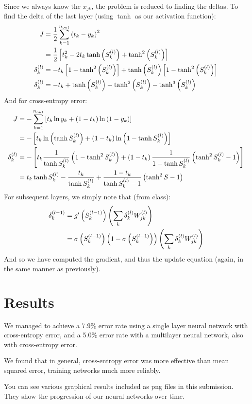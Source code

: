 \documentclass[11pt]{article}
\begin{document}
Since we always know the $x_{jk}$, the problem is reduced to finding the deltas. To find the delta of the last layer (using $\tanh$ as our activation function):
\begin{align}
	J &= \frac{1}{2}\sum_{k=1}^{n_{out}}\left( t_k - y_k \right) ^2 \\
	&= \frac{1}{2}\left[ t_k^2 - 2t_k \tanh \left( S_k^{(l)} \right) + \tanh ^2 \left( S_k^{(l)} \right) \right] \\
	\delta_k^{(l)} &=  - t_k \left[ 1 - \tanh ^2 \left( S_k^{(l)} \right) \right] + \tanh \left( S_k^{(l)} \right) \left[ 1 - \tanh ^2 \left( S_k^{(l)} \right) \right] \\
	\delta_k^{(l)} &= -t_k + \tanh \left( S_k^{(l)} \right) + \tanh ^2 \left( S_k^{(l)} \right) - \tanh ^3 \left( S_k^{(l)} \right) 
\end{align}
And for cross-entropy error:
\begin{align}
	J &= - \sum_{k=1}^{n_{out}}\left[t_k \ln y_k + \left(1- t_k \right)\ln \left( 1- y_k \right) \right] \\
	&= - \left[ t_k \ln \left( \tanh S_k^{(l)} \right) + \left( 1 - t_k \right) \ln \left( 1 - \tanh S_k^{(l)} \right) \right] \\
	\delta_k^{(l)} &= - \left[ t_k \frac{1}{\tanh S_k^{(l)}} \left( 1 - \tanh ^2 S_k^{(l)} \right) + \left( 1 - t_k \right) \frac{1}{1 - \tanh S_k^{(l)}} \left( \tanh ^2 S_k^{(l)} - 1 \right) \right]  \\
	&= t_k \tanh S_k^{(l)} - \frac{t_k}{\tanh S_k^{(l)}} + \frac{1 - t_k}{\tanh S_k^{(l)} - 1} \left( \tanh ^2 S - 1 \right) 
\end{align}
For subsequent layers, we simply note that (from class):
\begin{align*}
\delta_k^{(l-1)} &= g'\left( S_k^{(l-1)} \right) \left( \sum_k \delta_k^{(l)} W_{jk}^{(l)} \right) \\
&= \sigma \left( S_k^{(l-1)} \right) \left( 1 - \sigma \left( S_k^{(l-1)} \right) \right) \left( \sum_k \delta_k^{(l)} W_{jk}^{(l)} \right)
\end{align*}
And so we have computed the gradient, and thus the update equation (again, in the same manner as previously). 

\section{Results}
We managed to achieve a 7.9\% error rate using a single layer neural network with cross-entropy error, and a 5.0\% error rate with a multilayer neural network, also with cross-entropy error. 

We found that in general, cross-entropy error was more effective than mean squared error, training networks much more reliably. 

You can see various graphical results included as png files in this submission. They show the progression of our neural networks over time. 
\end{document}
